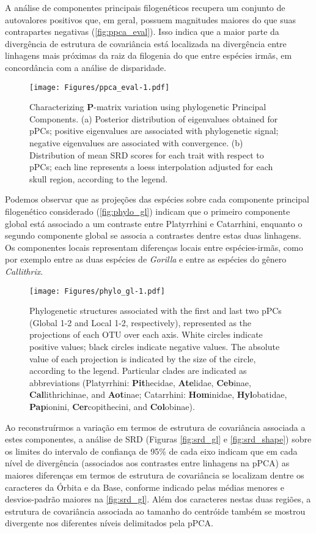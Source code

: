 \documentclass[12pt,twoside]{report}
\begin{document}
A análise de componentes principais filogenéticos recupera um conjunto
de autovalores positivos que, em geral, possuem magnitudes maiores do
que suas contrapartes negativas (\autoref{fig:ppca_eval}). Isso indica
que a maior parte da divergência de estrutura de covariância está
localizada na divergência entre linhagens mais próximas da raiz da
filogenia do que entre espécies irmãs, em concordância com a análise de
disparidade.

\begin{figure}[htbp]
\centering
\texttt{[image: Figures/ppca\_eval-1.pdf]}
\caption{Characterizing $\mathbf{P}$-matrix variation using phylogenetic
Principal Components. (a) Posterior distribution of eigenvalues obtained
for pPCs; positive eigenvalues are associated with phylogenetic signal;
negative eigenvalues are associated with convergence. (b) Distribution
of mean SRD scores for each trait with respect to pPCs; each line
represents a loess interpolation adjusted for each skull region,
according to the legend. \label{fig:ppca_eval}}
\end{figure}

Podemos observar que as projeções das espécies sobre cada componente
principal filogenético considerado (\autoref{fig:phylo_gl}) indicam que
o primeiro componente global está associado a um contraste entre
Platyrrhini e Catarrhini, enquanto o segundo componente global se
associa a contrastes dentre estas duas linhagens. Os componentes locais
representam diferenças locais entre espécies-irmãs, como por exemplo
entre as duas espécies de \emph{Gorilla} e entre as espécies do gênero
\emph{Callithrix}.

\begin{figure}[htbp]
\centering
\texttt{[image: Figures/phylo\_gl-1.pdf]}
\caption{Phylogenetic structures associated with the first and last two
pPCs (Global 1-2 and Local 1-2, respectively), represented as the
projections of each OTU over each axis. White circles indicate positive
values; black circles indicate negative values. The absolute value of
each projection is indicated by the size of the circle, according to the
legend. Particular clades are indicated as abbreviations (Platyrrhini:
\textbf{Pit}hecidae, \textbf{Ate}lidae, \textbf{Ceb}inae,
\textbf{Cal}lithrichinae, and \textbf{Aot}inae; Catarrhini:
\textbf{Hom}inidae, \textbf{Hyl}obatidae, \textbf{Pap}ionini,
\textbf{Cer}copithecini, and \textbf{Col}obinae). \label{fig:phylo_gl}}
\end{figure}

Ao reconstruírmos a variação em termos de estrutura de covariância
associada a estes componentes, a análise de SRD (Figuras
\ref{fig:srd_gl} e \ref{fig:srd_shape}) sobre os limites do intervalo de
confiança de 95\% de cada eixo indicam que em cada nível de divergência
(associados aos contrastes entre linhagens na pPCA) as maiores
diferenças em termos de estrutura de covariância se localizam dentre os
caracteres da Órbita e da Base, conforme indicado pelas médias menores e
desvios-padrão maiores na \autoref{fig:srd_gl}. Além dos caracteres
nestas duas regiões, a estrutura de covariância associada ao tamanho do
centróide também se mostrou divergente nos diferentes níveis delimitados
pela pPCA.
\end{document}
